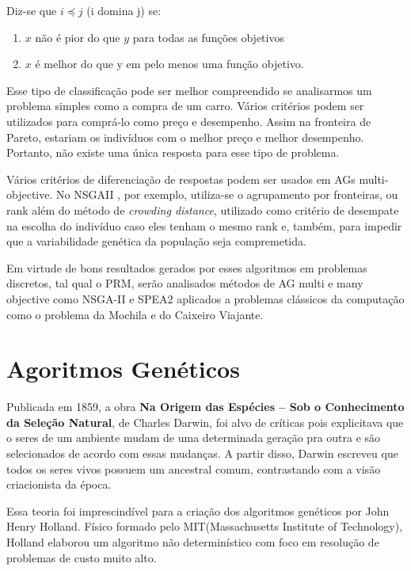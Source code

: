 \documentclass[]{article}
\begin{document}
	Diz-se que $i \preceq j$ (i domina j) se:
	
	\begin{enumerate}
		\item $x$ não é pior do que $y$ para todas as funções objetivos
		
		\item $x$ é melhor do que y em pelo menos uma função objetivo.
	\end{enumerate}
	
	Esse tipo de classificação pode ser melhor compreendido se analisarmos um problema simples como a compra de um carro. Vários critérios podem ser utilizados para comprá-lo como preço e desempenho. Assim na fronteira de Pareto, estariam os indivíduos com o melhor preço e melhor desempenho. Portanto, não existe uma única resposta para esse tipo de problema.
	
	Vários critérios de diferenciação de respostas podem ser usados em AGs multi-objective. No NSGAII \cite{NSGAII}, por exemplo, utiliza-se o agrupamento por fronteiras, ou rank além do método de \textit{crowding distance}, utilizado como critério de desempate na escolha do indivíduo caso eles tenham o mesmo rank e, também, para impedir que a variabilidade genética da população seja compremetida.
	
	Em virtude de bons resultados gerados por esses algoritmos em problemas discretos, tal qual o PRM, serão analisados métodos de AG multi e many objective como NSGA-II e SPEA2 aplicados a problemas clássicos da computação como o problema da Mochila e do Caixeiro Viajante. 
	
	
	
\section{Agoritmos Genéticos}

	Publicada em 1859, a obra \textbf{Na Origem das Espécies – Sob o Conhecimento da Seleção Natural}, de Charles Darwin, foi alvo de críticas pois explicitava que o seres de um ambiente mudam de uma determinada geração pra outra e são selecionados de acordo com essas mudanças. A partir disso, Darwin escreveu que todos os seres vivos possuem um ancestral comum, contrastando com a visão criacionista da época.
	
	Essa teoria foi imprescindível para a criação dos algoritmos genéticos por John Henry Holland. Físico formado pelo MIT(Massachusetts Institute of Technology), Holland elaborou um algoritmo não determinístico com foco em resolução de problemas de custo muito alto.
	
\end{document}
